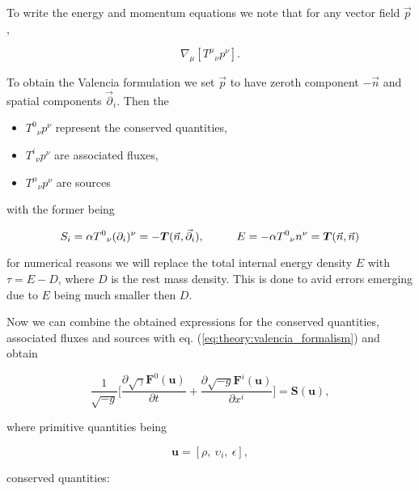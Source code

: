 \documentclass[11pt,a4paper,headinclude=true,DIV=14,BCOR=8mm,chapterprefix,listof=totoc,twoside,openright,abstracton]{scrbook}
\begin{document}
To write the energy and momentum equations we note that for any vector field $\vec{p} $ \cite{Rezzolla:2013}, 

\begin{equation}
    \nabla_{\mu}[{T^{\mu}}_{\nu}p^{\nu}].
\end{equation}

To obtain the Valencia formulation we set $\vec{p}$ to have zeroth component $-\vec{n}$ and spatial components $\vec{\partial}_i$. Then the

\begin{itemize}
    \item ${T^0}_{\nu}p^{\nu}$ represent the conserved quantities,
    \item ${T^i}_{\nu}p^{\nu}$ are associated fluxes,
    \item ${T^{\mu}}_{\nu}p^{\nu}$ are sources
\end{itemize}

with the former being 

\begin{equation}
    S_{i} = \alpha {T^0}_{\nu}(\partial_i)^{\nu}=-\boldsymbol{T}(\vec{n},\vec{\partial}_i), \hspace{10mm} E = -\alpha{T^0}_{\nu}n^{\nu} = \boldsymbol{T}(\vec{n},\vec{n})
\end{equation}

for numerical reasons we will replace the total internal energy density $E$ with $\tau = E-D$, where $D$ is the rest mass density. This is done to avid errors emerging due to $E$ being much smaller then $D$. 

Now we can combine the obtained expressions for the conserved quantities, associated fluxes and sources with eq. (\ref{eq:theory:valencia_formalism}) and obtain

\begin{equation}
    \frac{1}{\sqrt{-g}}\Big[\frac{\partial\sqrt{\gamma}\boldsymbol{F}^{0}(\boldsymbol{u})}{\partial t} + \frac{\partial\sqrt{-g}\boldsymbol{F}^{i}(\boldsymbol{u})}{\partial x^i}\Big] = \boldsymbol{S}(\boldsymbol{u}),
    \label{eq:theory:grhdeq_thc} %
\end{equation}

where primitive quantities being

\begin{equation}
    \boldsymbol{u} = [\rho,\: \upsilon_i,\: \epsilon],
\end{equation}

conserved quantities: 
\end{document}
